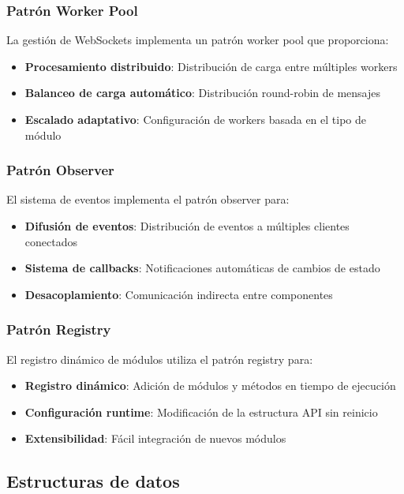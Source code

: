 \subsubsection{Patrón Worker Pool}
La gestión de WebSockets implementa un patrón worker pool que proporciona:
\begin{itemize}
    \item \textbf{Procesamiento distribuido}: Distribución de carga entre múltiples workers
    \item \textbf{Balanceo de carga automático}: Distribución round-robin de mensajes
    \item \textbf{Escalado adaptativo}: Configuración de workers basada en el tipo de módulo
\end{itemize}

\subsubsection{Patrón Observer}
El sistema de eventos implementa el patrón observer para:
\begin{itemize}
    \item \textbf{Difusión de eventos}: Distribución de eventos a múltiples clientes conectados
    \item \textbf{Sistema de callbacks}: Notificaciones automáticas de cambios de estado
    \item \textbf{Desacoplamiento}: Comunicación indirecta entre componentes
\end{itemize}

\subsubsection{Patrón Registry}
El registro dinámico de módulos utiliza el patrón registry para:
\begin{itemize}
    \item \textbf{Registro dinámico}: Adición de módulos y métodos en tiempo de ejecución
    \item \textbf{Configuración runtime}: Modificación de la estructura API sin reinicio
    \item \textbf{Extensibilidad}: Fácil integración de nuevos módulos
\end{itemize}

\subsection{Estructuras de datos}
\label{subsec:estructuras_datos_api_explorer}

